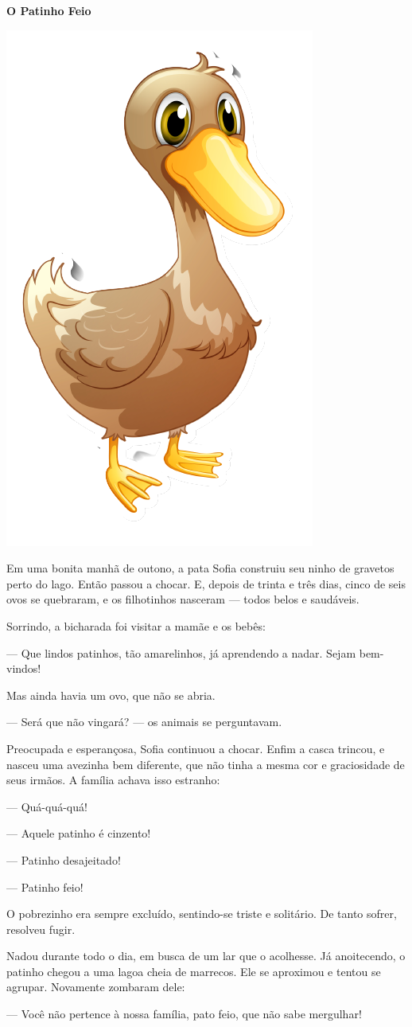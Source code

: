 \begin{myquote}

\textbf{O Patinho Feio}

\begin{center}
\includegraphics[width=.3\textwidth]{media/image36a.png}
\end{center}

Em uma bonita manhã de outono, a pata Sofia construiu seu ninho de
gravetos perto do lago. Então passou a chocar. E, depois de trinta e
três dias, cinco de seis ovos se quebraram, e os filhotinhos nasceram
--- todos belos e saudáveis.

Sorrindo, a bicharada foi visitar a mamãe e os bebês:

--- Que lindos patinhos, tão amarelinhos, já aprendendo a nadar. Sejam
bem-vindos!

Mas ainda havia um ovo, que não se abria.

--- Será que não vingará? --- os animais se perguntavam.

Preocupada e esperançosa, Sofia continuou a chocar. Enfim a casca
trincou, e nasceu uma avezinha bem diferente, que não tinha a mesma cor
e graciosidade de seus irmãos. A família achava isso estranho:

--- Quá-quá-quá!

--- Aquele patinho é cinzento!

--- Patinho desajeitado!

--- Patinho feio!

O pobrezinho era sempre excluído, sentindo-se triste e solitário. De
tanto sofrer, resolveu fugir.

Nadou durante todo o dia, em busca de um lar que o acolhesse. Já
anoitecendo, o patinho chegou a uma lagoa cheia de marrecos. Ele se
aproximou e tentou se agrupar. Novamente zombaram dele:

--- Você não pertence à nossa família, pato feio, que não sabe mergulhar!


\end{myquote}
